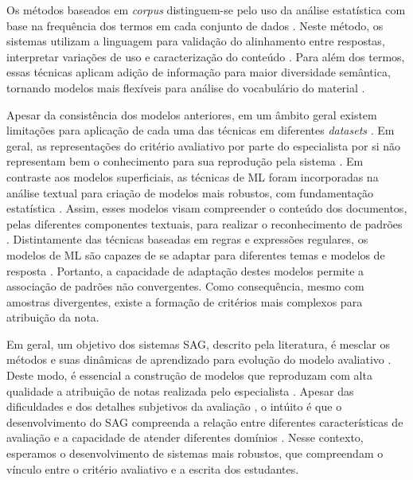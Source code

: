 Os métodos baseados em \textit{corpus} distinguem-se pelo uso da análise estatística com base na frequência dos termos em cada conjunto de dados \cite{kumar2019}. Neste método, os sistemas utilizam a linguagem para validação do alinhamento entre respostas, interpretar variações de uso e caracterização do conteúdo \cite{ziai2012, menini2019}. Para além dos termos, essas técnicas aplicam adição de informação para maior diversidade semântica, tornando modelos mais flexíveis para análise do vocabulário do material \cite{fowler2021}.

Apesar da consistência dos modelos anteriores, em um âmbito geral existem limitações para aplicação de cada uma das técnicas em diferentes \textit{datasets} \cite{riordan2019, ding2020}. Em geral, as representações do critério avaliativo por parte do especialista por si não representam bem o conhecimento para sua reprodução pela sistema \cite{filighera2020}. Em contraste aos modelos superficiais, as técnicas de ML foram incorporadas na análise textual para criação de modelos mais robustos, com fundamentação estatística \cite{galhardi2018b}. Assim, esses modelos visam compreender o conteúdo dos documentos, pelas diferentes componentes textuais, para realizar o reconhecimento de padrões \cite{suzen2020}. Distintamente das técnicas baseadas em regras e expressões regulares, os modelos de ML são capazes de se adaptar para diferentes temas e modelos de resposta \cite{zhang2016, saha2019, camus2020}. Portanto, a capacidade de adaptação destes modelos permite a associação de padrões não convergentes. Como consequência, mesmo com amostras divergentes, existe a formação de critérios mais complexos para atribuição da nota.

Em geral, um objetivo dos sistemas SAG, descrito pela literatura, é mesclar os métodos e suas dinâmicas de aprendizado para evolução do modelo avaliativo \cite{burrows2015, zesch2018}. Deste modo, é essencial a construção de modelos que reproduzam com alta qualidade a atribuição de notas realizada pelo especialista \cite{jordan2012}. Apesar das dificuldades e dos detalhes subjetivos da avaliação \cite{roy2018}, o intúito é que o desenvolvimento do SAG compreenda a relação entre diferentes características de avaliação e a capacidade de atender diferentes domínios \cite{sung2019a, saha2019}. Nesse contexto, esperamos o desenvolvimento de sistemas mais robustos, que compreendam o vínculo entre o critério avaliativo e a escrita dos estudantes.
